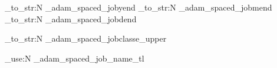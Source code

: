 \NewExpandableDocumentCommand{\docendyear}{}
 { \tl_to_str:N \g_adam_spaced_jobyend}
\NewExpandableDocumentCommand{\docendmonth}{}
 { \tl_to_str:N \g_adam_spaced_jobmend}
\NewExpandableDocumentCommand{\docendday}{}
 { \tl_to_str:N \g_adam_spaced_jobdend}

\NewExpandableDocumentCommand{\docclasseupper}{}
 {
  \tl_to_str:N \g_adam_spaced_jobclasse_upper
 }

\NewExpandableDocumentCommand{\spacedfilename}{}
 {
  \tl_use:N \g_adam_spaced_job_name_tl
 }
\ExplSyntaxOff

